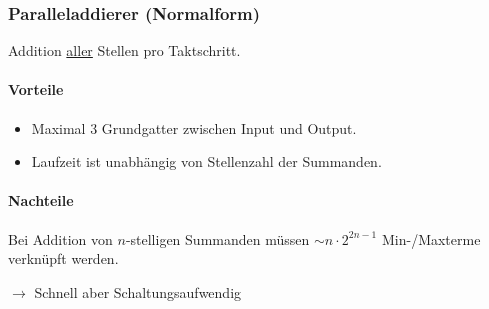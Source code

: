 \subsubsection{Paralleladdierer (Normalform)}
Addition \underline{aller} Stellen pro Taktschritt.
\begin{center}
    \small
    \begin{minipage}[t]{0.45\linewidth}
        \paragraph{Vorteile}
        \begin{itemize}
            \item Maximal 3 Grundgatter zwischen Input und Output.
            \item Laufzeit ist unabhängig von Stellenzahl der Summanden.
        \end{itemize}
    \end{minipage}
    \hfill
    \begin{minipage}[t]{0.45\linewidth}
        \paragraph{Nachteile}
            Bei Addition von $n$-stelligen Summanden müssen $\sim n \cdot 2^{2n - 1}$ Min-/Maxterme verknüpft werden.
    \end{minipage}
\end{center}
$\rightarrow$ Schnell aber Schaltungsaufwendig

